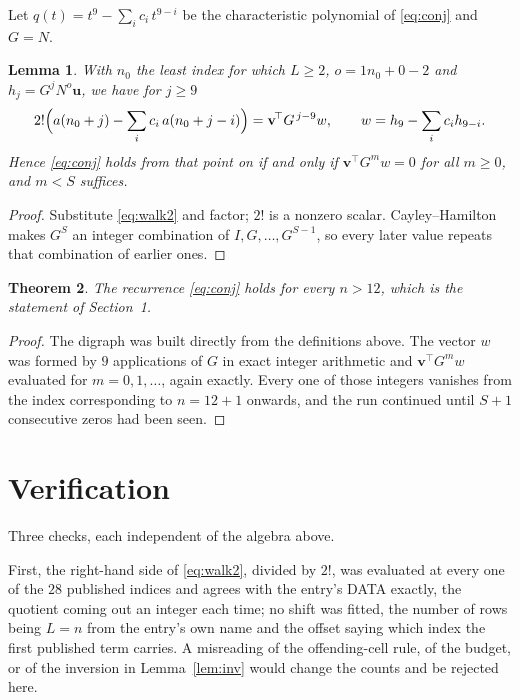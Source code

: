 \documentclass[11pt,a4paper]{article}
\theoremstyle{plain}
\newtheorem{theorem}{Theorem}
\newtheorem{lemma}[theorem]{Lemma}
\theoremstyle{definition}
\begin{document}
Let $q(t)=t^{9}-\sum_i c_i\,t^{9-i}$ be the characteristic polynomial of
\eqref{eq:conj} and $G=N$.

\begin{lemma}\label{lem:crit}
With $n_0$ the least index for which $L\ge2$, $o=1n_0+0-2$ and
$h_j=G^{j}N^{o}\mathbf{u}$, we have for $j\ge9$
\[
2!\Bigl(a(n_0+j)-\sum_i c_i\,a(n_0+j-i)\Bigr)=\mathbf{v}^{\!\top}G^{\,j-9}w,
\qquad w=h_{9}-\sum_i c_i h_{9-i} .
\]
Hence \eqref{eq:conj} holds from that point on if and only if
$\mathbf{v}^{\!\top}G^{m}w=0$ for all $m\ge0$, and $m<S$ suffices.
\end{lemma}

\begin{proof}
Substitute \eqref{eq:walk2} and factor; $2!$ is a nonzero scalar. Cayley--Hamilton
makes $G^{S}$ an integer combination of $I,G,\dots,G^{S-1}$, so every later value repeats
that combination of earlier ones.
\end{proof}

\begin{theorem}
The recurrence \eqref{eq:conj} holds for every $n>12$, which is the statement of
Section~1.
\end{theorem}

\begin{proof}
The digraph was built directly from the definitions above. The vector $w$ was formed by
$9$ applications of $G$ in exact integer arithmetic and $\mathbf{v}^{\!\top}G^{m}w$
evaluated for $m=0,1,\dots$, again exactly. Every one of those integers vanishes from the
index corresponding to $n=12+1$ onwards, and the run continued until $S+1$ consecutive
zeros had been seen.
\end{proof}

\section{Verification}

Three checks, each independent of the algebra above.

First, the right-hand side of \eqref{eq:walk2}, divided by $2!$, was evaluated at every
one of the $28$ published indices and agrees with the entry's DATA exactly, the quotient
coming out an integer each time; no shift was fitted, the number of rows being
$L=n$ from the entry's own name and the offset saying which index the first published
term carries. A misreading of the offending-cell rule, of the budget, or of the inversion in
Lemma~\ref{lem:inv} would change the counts and be rejected here.
\end{document}
